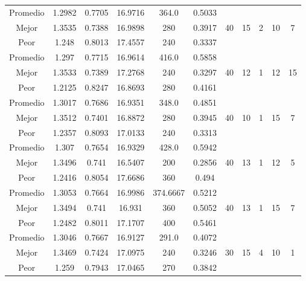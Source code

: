 \begin{table}[h!]
\begin{center}
\begin{tabular}{|c|c|c|c|c|c|c|c|c|c|c|}
        \hline
        \hline
            Promedio  & 1.2982 & 0.7705 & 16.9716 & 364.0 & 0.5033 &  &  &  &  & \\
            \cline{1-6}
            Mejor & 1.3535 & 0.7388  & 16.9898 & 280 & 0.3917 & 40 & 15 & 2 & 10 & 7\\
            \cline{1-6}
            Peor & 1.248 & 0.8013  & 17.4557 & 240 & 0.3337 &  &  &  &  & \\
        \hline
        \hline
            Promedio  & 1.297 & 0.7715 & 16.9614 & 416.0 & 0.5858 &  &  &  &  & \\
            \cline{1-6}
            Mejor & 1.3533 & 0.7389  & 17.2768 & 240 & 0.3297 & 40 & 12 & 1 & 12 & 15\\
            \cline{1-6}
            Peor & 1.2125 & 0.8247  & 16.8693 & 280 & 0.4161 &  &  &  &  & \\
        \hline
        \hline
            Promedio  & 1.3017 & 0.7686 & 16.9351 & 348.0 & 0.4851 &  &  &  &  & \\
            \cline{1-6}
            Mejor & 1.3512 & 0.7401  & 16.8872 & 280 & 0.3945 & 40 & 10 & 1 & 15 & 7\\
            \cline{1-6}
            Peor & 1.2357 & 0.8093  & 17.0133 & 240 & 0.3313 &  &  &  &  & \\
        \hline
        \hline
            Promedio  & 1.307 & 0.7654 & 16.9329 & 428.0 & 0.5942 &  &  &  &  & \\
            \cline{1-6}
            Mejor & 1.3496 & 0.741  & 16.5407 & 200 & 0.2856 & 40 & 13 & 1 & 12 & 5\\
            \cline{1-6}
            Peor & 1.2416 & 0.8054  & 17.6686 & 360 & 0.494 &  &  &  &  & \\
        \hline
        \hline
            Promedio  & 1.3053 & 0.7664 & 16.9986 & 374.6667 & 0.5212 &  &  &  &  & \\
            \cline{1-6}
            Mejor & 1.3494 & 0.741  & 16.931 & 360 & 0.5052 & 40 & 13 & 1 & 15 & 7\\
            \cline{1-6}
            Peor & 1.2482 & 0.8011  & 17.1707 & 400 & 0.5461 &  &  &  &  & \\
        \hline
        \hline
            Promedio  & 1.3046 & 0.7667 & 16.9127 & 291.0 & 0.4072 &  &  &  &  & \\
            \cline{1-6}
            Mejor & 1.3469 & 0.7424  & 17.0975 & 240 & 0.3246 & 30 & 15 & 4 & 10 & 1\\
            \cline{1-6}
            Peor & 1.259 & 0.7943  & 17.0465 & 270 & 0.3842 &  &  &  &  & \\

\end{tabular}
\end{center}
\end{table}
